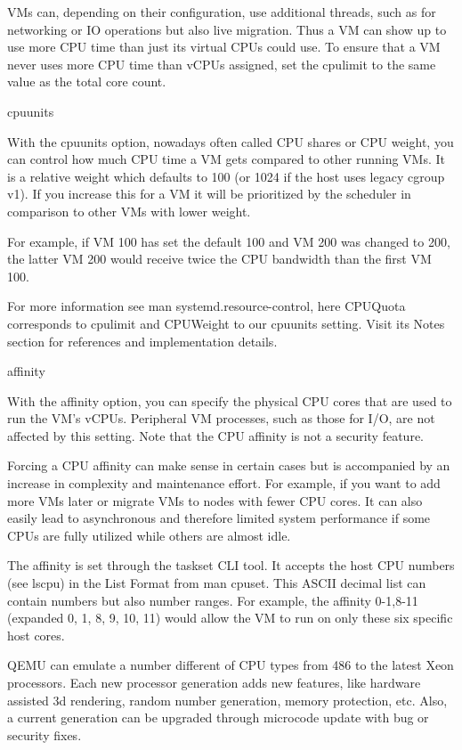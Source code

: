 VMs can, depending on their configuration, use additional threads, such as for networking or IO operations but also live migration. Thus a VM can show up to use more CPU time than just its virtual CPUs could use. To ensure that a VM never uses more CPU time than vCPUs assigned, set the cpulimit to the same value as the total core count.

cpuunits

With the cpuunits option, nowadays often called CPU shares or CPU weight, you can control how much CPU time a VM gets compared to other running VMs. It is a relative weight which defaults to 100 (or 1024 if the host uses legacy cgroup v1). If you increase this for a VM it will be prioritized by the scheduler in comparison to other VMs with lower weight.

For example, if VM 100 has set the default 100 and VM 200 was changed to 200, the latter VM 200 would receive twice the CPU bandwidth than the first VM 100.

For more information see man systemd.resource-control, here CPUQuota corresponds to cpulimit and CPUWeight to our cpuunits setting. Visit its Notes section for references and implementation details.

affinity

With the affinity option, you can specify the physical CPU cores that are used to run the VM’s vCPUs. Peripheral VM processes, such as those for I/O, are not affected by this setting. Note that the CPU affinity is not a security feature.

Forcing a CPU affinity can make sense in certain cases but is accompanied by an increase in complexity and maintenance effort. For example, if you want to add more VMs later or migrate VMs to nodes with fewer CPU cores. It can also easily lead to asynchronous and therefore limited system performance if some CPUs are fully utilized while others are almost idle.

The affinity is set through the taskset CLI tool. It accepts the host CPU numbers (see lscpu) in the List Format from man cpuset. This ASCII decimal list can contain numbers but also number ranges. For example, the affinity 0-1,8-11 (expanded 0, 1, 8, 9, 10, 11) would allow the VM to run on only these six specific host cores.

QEMU can emulate a number different of CPU types from 486 to the latest Xeon processors. Each new processor generation adds new features, like hardware assisted 3d rendering, random number generation, memory protection, etc. Also, a current generation can be upgraded through microcode update with bug or security fixes.

